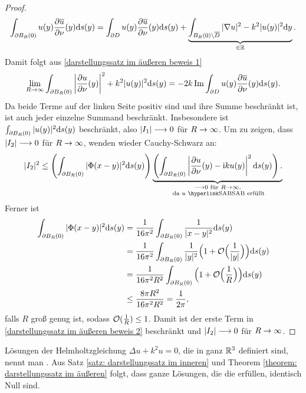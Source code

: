 \begin{proof}
 	\begin{equation*}
 		\int_{\partial B_R(0)}u(y)\frac{\partial\overline{u}}{\partial\nu}(y)\mathrm{d}s(y)=\int_{\partial D}u(y)\frac{\partial \overline{u}}{\partial\nu}(y)\mathrm{d}s(y)+\underbrace{\int_{B_R(0)\setminus\overline{D}}|\nabla u|^2-k^2|u(y)|^2\mathrm{d}y}_{\in\mathbb{R}}.
 	\end{equation*}
 	Damit folgt aus \eqref{darstellungssatz im äußeren beweis 1}
 	\begin{equation*}
 		\lim_{R\rightarrow\infty}\int_{\partial B_R(0)}\left|\frac{\partial u}{\partial\nu}(y)\right|^2+k^2|u(y)|^2\mathrm{d}s(y)=-2k\operatorname{Im}\int_{\partial D}u(y)\frac{\partial \overline{u}}{\partial\nu}(y)\mathrm{d}s(y).
 	\end{equation*}
 	Da beide Terme auf der linken Seite positiv sind und ihre Summe beschränkt ist, ist auch jeder einzelne Summand beschränkt. Insbesondere ist \(\int_{\partial B_R(0)}|u(y)|^2\mathrm{d}s(y)\) beschränkt, also \(|I_1|\longrightarrow0\) für \(R\rightarrow\infty\). Um zu zeigen, dass \(|I_2|\longrightarrow0\) für \(R\rightarrow\infty\), wenden wieder Cauchy-Schwarz an:
 	\begin{equation}
 		\label{darstellungssatz im äußeren beweis 2}
 		|I_2|^2\leq\left(\int_{\partial B_R(0)}|\Phi(x-y)|^2\ds(y)\right)\underbrace{\left(\int_{\partial B_R(0)}\left|\frac{\p u}{\p\normal}(y)-\ii ku(y)\right|^2\ds(y)\right).}_{\substack{\lorarr0\te{ für }R\rarr\infty,\\\te{ da }u\te{ \SAB erfüllt}}}
 	\end{equation}
 	Ferner ist
 	\begin{align*}
 		\int_{\partial B_R(0)}|\Phi(x-y)|^2\mathrm{d}s(y)
 		&=\frac{1}{16\pi^2}\int_{\partial B_R(0)}\frac{1}{|x-y|^2}\mathrm{d}s(y)\\
 		&=\frac{1}{16\pi^2}\int_{\partial B_R(0)}\frac{1}{|y|^2}\Big(1+\mathcal{O}\Big(\frac{1}{|y|}\Big)\Big)\mathrm{d}s(y)\\
 		&=\frac{1}{16\pi^2R^2}\int_{\partial B_R(0)}\Big(1+\mathcal{O}\Big(\frac{1}{R}\Big)\Big)\mathrm{d}s(y)\\
 		&\leq\frac{8\pi R^2}{16\pi^2R^2}=\frac{1}{2\pi},
 	\end{align*}
 	falls \(R\) groß genug ist, sodass \(\mathcal{O}(\frac{1}{R})\leq1\). Damit ist der erste Term in \eqref{darstellungssatz im äußeren beweis 2} beschränkt und \(|I_2|\longrightarrow0\) für \(R\rightarrow\infty\).
\end{proof}
\begin{no counter korollar}
	Lösungen der Helmholtzgleichung \(\Delta u+k^2u=0\), die in ganz \(\mathbb{R}^3\) definiert sind, nennt man . Aus Satz \ref{satz: darstellungssatz im inneren} und Theorem \ref{theorem: darstellungssatz im äußeren} folgt, dass ganze Lösungen, die die \SAB erfüllen, identisch Null sind.
\end{no counter korollar}
